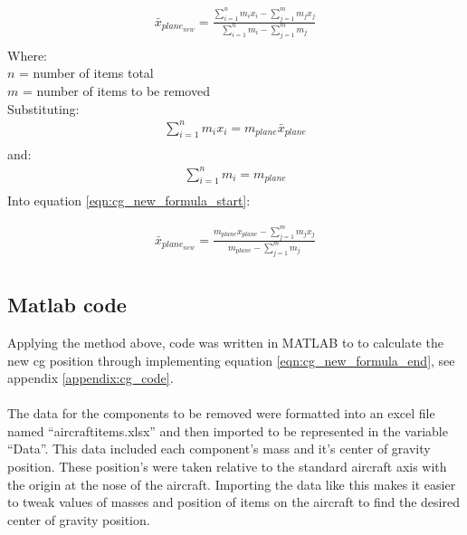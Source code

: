 \begin{equation}
\begin{split}
  \bar{x}_{plane_{new}} = \frac{ \sum_{i=1}^{n}{m_{i} x_{i}} - \sum_{j=1}^{m}{m_{j} x_{j}}}{ \sum_{i=1}^{n}{m_{i}} - \sum_{j=1}^{m}{m_{j}}} \\
\end{split}
\label{eqn:cg_new_formula_start}
\end{equation}
Where: \\
$n$ = number of items total \\
$m$ = number of items to be removed \\

Substituting:
\begin{equation}
\begin{split}
  \sum_{i=1}^{n}{m_{i} x_{i}} = m_{plane} \bar{x}_{plane} \\
\end{split}
\label{eqn:m_plane_x_plane_formula}
\end{equation}
and:
\begin{equation}
\begin{split}
  \sum_{i=1}^{n}{m_{i}} = m_{plane} \\
\end{split}
\label{eqn:m_plane_formula}
\end{equation}
Into equation \ref{eqn:cg_new_formula_start}:

\begin{equation}
\begin{split}
  \bar{x}_{plane_{new}} = \frac{ m_{plane} x_{plane} - \sum_{j=1}^{m}{m_{j} x_{j}}}{ m_{plane} - \sum_{j=1}^{m}{m_{j}}} \\
\end{split}
\label{eqn:cg_new_formula_end}
\end{equation}

\subsection{Matlab code}
Applying the method above, code was written in MATLAB to to calculate the new cg position through implementing equation \ref{eqn:cg_new_formula_end}, see appendix \ref{appendix:cg_code}. \\  \\
The data for the components to be removed were formatted into an excel file named “aircraftitems.xlsx” and then imported to be represented in the variable “Data”.
This data included each component's mass and it's center of gravity position.
These position's were taken relative to the standard aircraft axis with the origin at the nose of the aircraft.
Importing the data like this makes it easier to tweak values of masses and position of items on the aircraft to find the desired center of gravity position.


